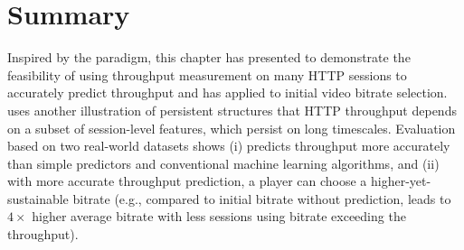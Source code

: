 









\section{Summary}
\label{sec:dda:summary}
Inspired by the \ddn paradigm, this chapter
has presented \name to demonstrate the feasibility of using 
throughput measurement on many HTTP sessions to 
accurately predict throughput and has applied \name to initial video bitrate
selection.
\name uses another illustration of persistent structures that HTTP throughput 
depends on a subset of session-level features, which persist on long timescales.
Evaluation based on two real-world datasets shows (i) \name predicts throughput more accurately than simple predictors and conventional machine learning algorithms, and (ii) with more accurate throughput prediction, a player can choose a higher-yet-sustainable bitrate (e.g., compared to initial bitrate without prediction, \name leads to $4\times$ higher average bitrate with less sessions using bitrate exceeding the throughput).




